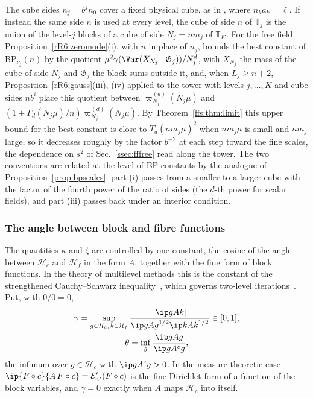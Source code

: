 \begin{remark}\label{rR6:convention}
The cube sides $n_j=b^jn_0$ cover a fixed physical cube, as in
\cite[Corollary~102]{BBLR26}, where $n_ka_k=\ell$. If instead the same
side $n$ is used at every level, the cube of side $n$ of $\mathbb T_j$ is
the union of the level-$j$ blocks of a cube of side $N_j=nm_j$ of $\mathbb
T_K$. For the free field Proposition~\ref{rR6:zeromode}(i), with $n$ in
place of $n_j$, bounds the best constant of $\mathrm{BP}_{\nu_j}(n)$ by the
quotient $\mu^2\gamma(\Var(X_{N_j}\mid\mathfrak G_j))/N_j^d$, with
$X_{N_j}$ the mass of the cube of side $N_j$ and $\mathfrak G_j$ the block
sums outside it, and, when $L_j\ge n+2$,
Proposition~\ref{rR6:gauss}(iii), (iv) applied to the tower with levels
$j,\dots,K$ and cube sides $nb^i$ place this quotient between
$\varpi^{(d)}_{N_j}(N_j\mu)$ and $(1+\Gamma_d(N_j\mu)/n)\varpi^{(d)}_{N_j}
(N_j\mu)$. By Theorem~\ref{ffs:thm:limit} this upper bound for the best
constant is close to $T_d(nm_j\mu)^2$ when $nm_j\mu$ is small and $nm_j$
large, so it decreases roughly by the factor $b^{-2}$ at each step toward
the fine scales, the dependence on
$s^2$ of Sec.~\ref{ssec:fffree} read along the tower. The two conventions
are related at the level of $\mathrm{BP}$ constants by the analogue of
Proposition~\ref{prop:bpscales}: part (i) passes from a smaller to a larger
cube with the factor of the fourth power of the ratio of sides (the $d$-th
power for scalar fields), and part (iii) passes back under an interior
condition.
\end{remark}

\subsubsection{The angle between block and fibre functions}

The quantities $\kappa$ and $\zeta$ are controlled by one constant, the
cosine of the angle between $\mathcal H_c$ and $\mathcal H_f$ in the form
$A$, together with the fine form of block functions. In the theory of
multilevel methods this is the constant of the strengthened
Cauchy--Schwarz inequality~\cite{EV91}, which governs two-level
iterations~\cite{XZ02}. Put, with $0/0=0$,
\begin{gather*}
\gamma=\sup_{g\in\mathcal H_c,\,k\in\mathcal H_f}\frac{\lvert\ip g{Ak}
\rvert}{\ip g{Ag}^{1/2}\ip k{Ak}^{1/2}}\in[0,1],\\
\theta=\inf_g\frac{\ip g{Ag}}{\ip g{A^cg}},
\end{gather*}
the infimum over $g\in\mathcal H_c$ with $\ip g{A^cg}>0$. In the
measure-theoretic case $\ip{F\circ c}{A\,F\circ c}=\mathcal E'_{n'}(F\circ
c)$ is the fine Dirichlet form of a function of the block variables, and
$\gamma=0$ exactly when $A$ maps $\mathcal H_c$ into itself.


